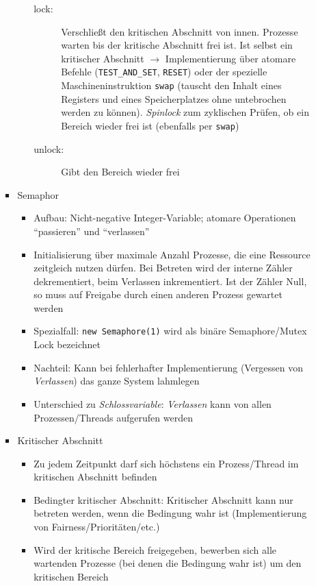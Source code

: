 \begin{itemize}
\begin{itemize}
\begin{itemize}
\begin{itemize}
				\begin{description}
					\item[lock:] Verschließt den kritischen Abschnitt von innen. Prozesse warten bis der kritische Abschnitt frei ist. Ist selbst ein kritischer Abschnitt \(\rightarrow\) Implementierung über atomare Befehle (\texttt{TEST\_AND\_SET}, \texttt{RESET}) oder der spezielle Maschineninstruktion \texttt{swap} (tauscht den Inhalt eines Registers und eines Speicherplatzes ohne untebrochen werden zu können). \textit{Spinlock} zum zyklischen Prüfen, ob ein Bereich wieder frei ist (ebenfalls per \texttt{swap})
					\item[unlock:] Gibt den Bereich wieder frei
				\end{description}
			\end{itemize}
			\item Semaphor
			\begin{itemize}
				\item Aufbau: Nicht-negative Integer-Variable; atomare Operationen "`passieren"' und "`verlassen"'
				\item Initialisierung über maximale Anzahl Prozesse, die eine Ressource zeitgleich nutzen dürfen. Bei Betreten wird der interne Zähler dekrementiert, beim Verlassen inkrementiert. Ist der Zähler Null, so muss auf Freigabe durch einen anderen Prozess gewartet werden
				\item Spezialfall: \texttt{new Semaphore(1)} wird als binäre Semaphore/Mutex Lock bezeichnet
				\item Nachteil: Kann bei fehlerhafter Implementierung (Vergessen von \textit{Verlassen}) das ganze System lahmlegen
				\item Unterschied zu \textit{Schlossvariable}: \textit{Verlassen} kann von allen Prozessen/Threads aufgerufen werden
			\end{itemize}
			\item Kritischer Abschnitt
			\begin{itemize}
				\item Zu jedem Zeitpunkt darf sich höchstens ein Prozess/Thread im kritischen Abschnitt befinden
				\item Bedingter kritischer Abschnitt: Kritischer Abschnitt kann nur betreten werden, wenn die Bedingung wahr ist (Implementierung von Fairness/Prioritäten/etc.)
				\item Wird der kritische Bereich freigegeben, bewerben sich alle wartenden Prozesse (bei denen die Bedingung wahr ist) um den kritischen Bereich
			\end{itemize}

\end{itemize}
\end{itemize}
\end{itemize}
